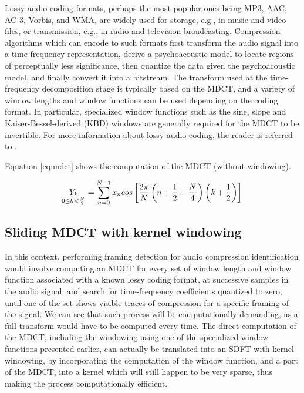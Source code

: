 \documentclass[journal]{IEEEtran}
\begin{document}
Lossy audio coding formats, perhaps the most popular ones being MP3, AAC, AC-3, Vorbis, and WMA, are widely used for storage, e.g., in music and video files, or transmission, e.g., in radio and television broadcasting. Compression algorithms which can encode to such formats first transform the audio signal into a time-frequency representation, derive a psychoacoustic model to locate regions of perceptually less significance, then quantize the data given the psychoacoustic model, and finally convert it into a bitstream. The transform used at the time-frequency decomposition stage is typically based on the MDCT, and a variety of window lengths and window functions can be used depending on the coding format. In particular, specialized window functions such as the sine, slope and Kaiser-Bessel-derived (KBD) windows are generally required for the MDCT to be invertible. For more information about lossy audio coding, the reader is referred to \cite{bosi2003}.

Equation \ref{eq:mdct} shows the computation of the MDCT (without windowing).

\begin{equation}
\label{eq:mdct}
\underset{0 \leq k < \frac{N}{2}}{Y_k}  = \sum_{n=0}^{N-1} x_n cos \left[\frac{2\pi}{N} \left(n+\frac{1}{2}+\frac{N}{4}\right)\left(k+\frac{1}{2}\right)\right] \\
\end{equation}

\subsection{Sliding MDCT with kernel windowing}

In this context, performing framing detection for audio compression identification would involve computing an MDCT for every set of window length and window function associated with a known lossy coding format, at successive samples in the audio signal, and search for time-frequency coefficients quantized to zero, until one of the set shows visible traces of compression for a specific framing of the signal. We can see that such process will be computationally demanding, as a full transform would have to be computed every time. The direct computation of the MDCT, including the windowing using one of the specialized window functions presented earlier, can actually be translated into an SDFT with kernel windowing, by incorporating the computation of the window function, and a part of the MDCT, into a kernel which will still happen to be very sparse, thus making the process computationally efficient.
\end{document}
